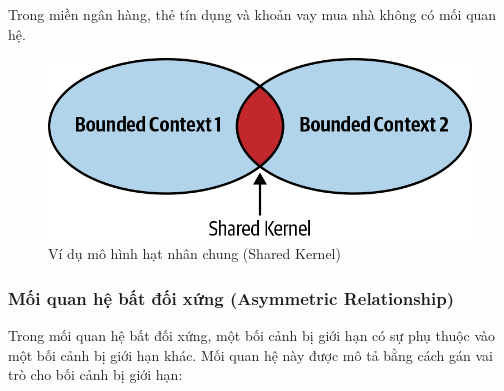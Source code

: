 \begin{example} Trong miền    ngân hàng, thẻ tín dụng và khoản vay mua nhà không có mối quan hệ.

\begin{figure}[H]

\centering

\includegraphics[scale = 1]{pictures/_vi_du_mo_hinh_hat_nhan_chung_shared_kernel/main.png}

\caption{Ví dụ mô hình hạt nhân chung (Shared Kernel)}

\end{figure}

\end{example}








\subsubsection{Mối quan hệ bất đối xứng (Asymmetric Relationship)}









Trong mối quan hệ bất đối xứng, một bối cảnh bị giới hạn có sự phụ thuộc vào một bối cảnh bị giới hạn khác. Mối quan hệ này được mô tả bằng cách gán vai trò cho bối cảnh bị giới hạn:











